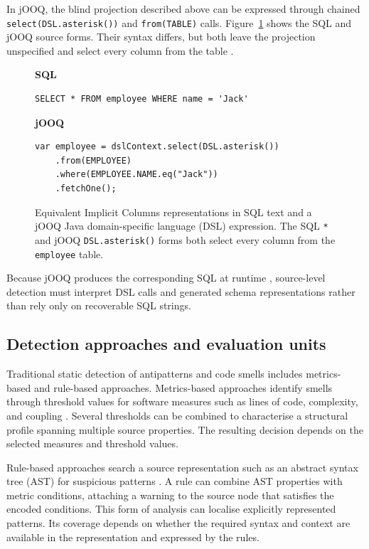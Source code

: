 In jOOQ, the blind projection described above can be expressed through chained \texttt{select(DSL.asterisk())} and \texttt{from(TABLE)} calls. Figure~\ref{fig:implicitColumnsRepresentations} shows the SQL and jOOQ source forms. Their syntax differs, but both leave the projection unspecified and select every column from the table .

\begin{figure}[tbp]
    \textbf{SQL}
    \begin{lstlisting}[frame=none,basicstyle=\small\ttfamily,columns=fullflexible]
SELECT * FROM employee WHERE name = 'Jack'
    \end{lstlisting}

    \textbf{jOOQ}
    \begin{lstlisting}[frame=none,basicstyle=\small\ttfamily,columns=fullflexible]
var employee = dslContext.select(DSL.asterisk())
    .from(EMPLOYEE)
    .where(EMPLOYEE.NAME.eq("Jack"))
    .fetchOne();
    \end{lstlisting}
    \caption{Equivalent Implicit Columns representations in SQL text and a jOOQ Java domain-specific language (DSL) expression. The SQL \texttt{*} and jOOQ \texttt{DSL.asterisk()} forms both select every column from the \texttt{employee} table.}
    \label{fig:implicitColumnsRepresentations}
\end{figure}

Because jOOQ produces the corresponding SQL at runtime , source-level detection must interpret DSL calls and generated schema representations rather than rely only on recoverable SQL strings.

\subsection{Detection approaches and evaluation units}\label{sec:staticAnalysis}

Traditional static detection of antipatterns and code smells includes metrics-based and rule-based approaches. Metrics-based approaches identify smells through threshold values for software measures such as lines of code, complexity, and coupling . Several thresholds can be combined to characterise a structural profile spanning multiple source properties. The resulting decision depends on the selected measures and threshold values.

Rule-based approaches search a source representation such as an abstract syntax tree (AST) for suspicious patterns . A rule can combine AST properties with metric conditions, attaching a warning to the source node that satisfies the encoded conditions. This form of analysis can localise explicitly represented patterns. Its coverage depends on whether the required syntax and context are available in the representation and expressed by the rules.

